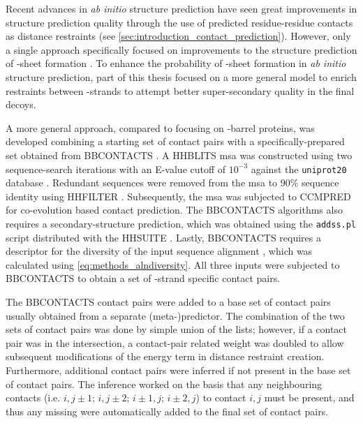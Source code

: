 Recent advances in \textit{ab initio} structure prediction have seen great improvements in structure prediction quality through the use of predicted residue-residue contacts as distance restraints (see \cref{sec:introduction_contact_prediction}). However, only a single approach specifically focused on improvements to the structure prediction of \textbeta-sheet formation \cite{Hayat2015-ut}. To enhance the probability of \textbeta-sheet formation in \textit{ab initio} structure prediction, part of this thesis focused on a more general model to enrich restraints between \textbeta-strands to attempt better super-secondary quality in the final decoys.

A more general approach, compared to \cite{Hayat2015-ut} focusing on \textbeta-barrel proteins, was developed combining a starting set of contact pairs with a specifically-prepared set obtained from BBCONTACTS \cite{Andreani2015-qn}. A HHBLITS \cite{Remmert2011-kt} \gls{msa} was constructed using two sequence-search iterations with an E-value cutoff of $10^{-3}$ against the \texttt{uniprot20} database \cite{Bateman2017-pb}. Redundant sequences were removed from the \gls{msa} to 90\% sequence identity using HHFILTER \cite{Remmert2011-kt}. Subsequently, the \gls{msa} was subjected to CCMPRED \cite{Seemayer2014-zp} for co-evolution based contact prediction. The BBCONTACTS algorithms also requires a secondary-structure prediction, which was obtained using the \texttt{addss.pl} script \cite{Remmert2011-kt} distributed with the HHSUITE \cite{Soding2005-hw}. Lastly, BBCONTACTS requires a descriptor for the diversity of the input sequence alignment \cite{Andreani2015-qn}, which was calculated using \cref{eq:methods_alndiversity}. All three inputs were subjected to BBCONTACTS to obtain a set of \textbeta-strand specific contact pairs.

The BBCONTACTS contact pairs were added to a base set of contact pairs usually obtained from a separate (meta-)predictor. The combination of the two sets of contact pairs was done by simple union of the lists; however, if a contact pair was in the intersection, a contact-pair related weight was doubled to allow subsequent modifications of the energy term in distance restraint creation. Furthermore, additional contact pairs were inferred if not present in the base set of contact pairs. The inference worked on the basis that any neighbouring contacts (i.e. $i,j\pm1$; $i,j\pm2$; $i\pm  1,j$; $i\pm2,j$) to contact $i,j$ must be present, and thus any missing were automatically added to the final set of contact pairs. 


